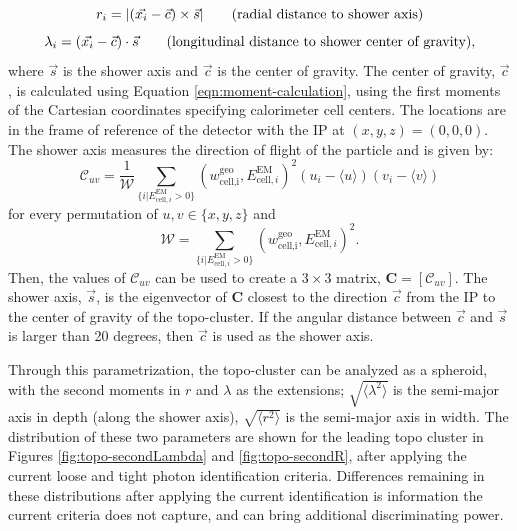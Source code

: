 \begin{equation}
    r_i = |(\vec{x_i} - \vec{c}) \times \vec{s}| \text{\hspace{2em}(radial distance to shower axis)} \\
\end{equation}
\begin{equation}
    \lambda_i = (\vec{x_i} - \vec{c}) \cdot \vec{s} \text{\hspace{2em}(longitudinal distance to shower center of gravity)},
\end{equation}
where $\vec{s}$ is the shower axis and $\vec{c}$ is the center of gravity. The center of gravity, $\vec{c}$, is calculated using Equation \ref{eqn:moment-calculation}, using the first moments of the Cartesian coordinates specifying calorimeter cell centers. The locations are in the frame of reference of the detector with the \gls{IP} at $(x,y,z)= (0,0,0)$. The shower axis measures the direction of flight of the particle and is given by:
\begin{equation}
    \mathcal{C}_{uv} = \frac{1}{\mathcal{W}} \sum\limits_{\{i|E_{\text{cell},i}^{\text{EM}} >0\}}(w^{\text{geo}}_{\text{cell,i}}, E_{\text{cell},i}^{\text{EM}})^2 (u_i - \langle u \rangle)(v_i - \langle v \rangle)
\end{equation}
for every permutation of $u,v \in \{x,y,z\}$ and 
\begin{equation}
    \mathcal{W} = \sum\limits_{\{i|E_{\text{cell},i}^{\text{EM}} >0\}} (w^{\text{geo}}_{\text{cell,i}}, E_{\text{cell},i}^{\text{EM}})^2.
\end{equation}
Then, the values of $\mathcal{C}_{uv}$ can be used to create a $3 \times 3$ matrix, $\mathbf{C}=[\mathcal{C}_{uv}]$. The shower axis, $\vec{s}$, is the eigenvector of $\boldsymbol{C}$ closest to the direction $\vec{c}$ from the \gls{IP} to the center of gravity of the topo-cluster. If the angular distance between $\vec{c}$ and $\vec{s}$ is larger than 20 degrees, then $\vec{c}$ is used as the shower axis.

 Through this parametrization, the topo-cluster can be analyzed as a spheroid, with the second moments in $r$ and $\lambda$ as the extensions; $\sqrt{\langle \lambda^2 \rangle}$ is the semi-major axis in depth (along the shower axis), $\sqrt{\langle r^2 \rangle}$ is the semi-major axis in width. The distribution of these two parameters are shown for the leading topo cluster in Figures \ref{fig:topo-secondLambda} and \ref{fig:topo-secondR}, after applying the current loose and tight photon identification criteria. Differences remaining in these distributions after applying the current identification is information the current criteria does not capture, and can bring additional discriminating power.


